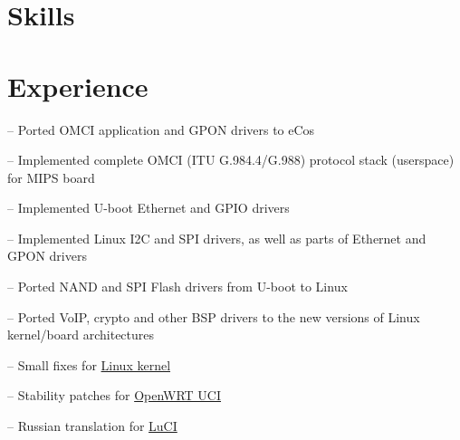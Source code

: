 \documentclass{cv}
\begin{document}
\section{Skills}
\begin{sklist}
\end{sklist}
\section{Experience}
\begin{joblist}
{
  \par -- Ported OMCI application and GPON drivers to eCos
}
{
  \par -- Implemented complete OMCI (ITU G.984.4/G.988) protocol stack (userspace) for MIPS board
  \par -- Implemented U-boot Ethernet and GPIO drivers
  \par -- Implemented Linux I2C and SPI drivers, as well as parts of Ethernet and GPON drivers
  \par -- Ported NAND and SPI Flash drivers from U-boot to Linux
  \par -- Ported VoIP, crypto and other BSP drivers to the new versions of Linux kernel/board architectures
  }
{
  \par -- Small fixes for \href{http://git.kernel.org/?p=linux\%2Fkernel\%2Fgit\%2Ftorvalds\%2Flinux.git\&a=search\&h=HEAD\&st=commit\&s=Stanislav+Fomichev}{Linux kernel}
  \par -- Stability patches for \href{http://nbd.name/gitweb.cgi?p=uci.git\&a=search\&h=HEAD\&st=commit\&s=Stanislav+Fomichev}{OpenWRT UCI}
  \par -- Russian translation for \href{http://i18n.luci.subsignal.org/pootle/ru/}{LuCI}
}
\end{joblist}
\end{document}

